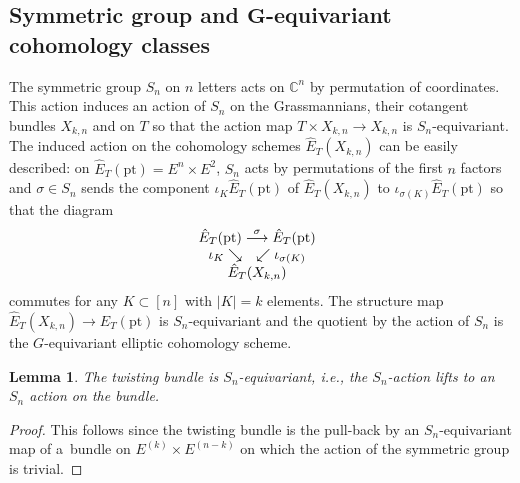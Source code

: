 \documentclass[10pt,a4paper]{amsart}
\numberwithin{equation}{section}
\newtheorem{Lemma}[Theorem]{Lemma}
\begin{document}
\subsection[Symmetric group and $G$-equivariant cohomology classes]{Symmetric group and $\boldsymbol{G}$-equivariant cohomology classes}

The symmetric group $S_n$ on $n$ letters acts on $\mathbb C^n$ by permutation of coordinates. This action induces an action of $S_n$ on the Grassmannians, their cotangent bundles $X_{k,n}$ and on $T$ so that the action map
$T\times X_{k,n}\to X_{k,n}$ is $S_n$-equivariant. The induced action on the cohomology schemes $\hat E_T(X_{k,n})$ can be easily described: on $\hat E_T(\mathrm{pt})=E^n\times E^2$, $S_n$ acts by permutations of the first $n$ factors and $\sigma\in S_n$ sends the component $\iota_K\hat E_T(\mathrm{pt})$ of $\hat E_T(X_{k,n})$ to $\iota_{\sigma(K)}\hat E_T(\mathrm{pt})$ so that the diagram
\begin{gather*}
 \begin{array}{@{}c} \hat E_T(\mathrm{pt})
 \stackrel{\sigma}\longrightarrow \hat E_T(\mathrm{pt})\\
 \iota_K\searrow \quad\swarrow\iota_{\sigma(K)}\\ \hat E_T(X_{k,n})
 \end{array}
\end{gather*}
commutes for any $K\subset[n]$ with $|K|=k$ elements. The structure map $\hat E_T(X_{k,n})\to \hat E_T(\mathrm{pt})$ is $S_n$-equivariant and the quotient by the action of $S_n$ is the $G$-equivariant elliptic cohomology scheme.

\begin{Lemma}\label{lemma-8} The twisting bundle is $S_n$-equivariant, i.e., the $S_n$-action lifts to an $S_n$ action on the bundle.
\end{Lemma}
\begin{proof} This follows since the twisting bundle is the pull-back by an $S_n$-equivariant map of a~bundle on $E^{(k)}\times E^{(n-k)}$ on which the action of the symmetric group is trivial.
\end{proof}
\end{document}
